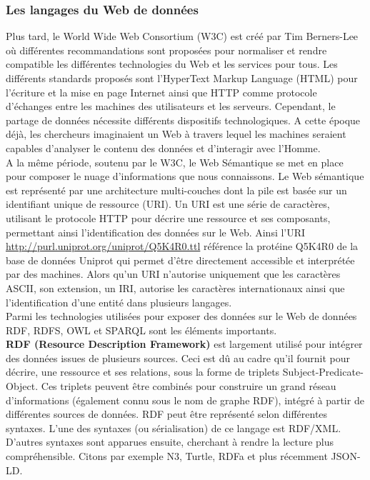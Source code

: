 \subsubsection*{Les langages du Web de données}

Plus tard, le World Wide Web Consortium (W3C) est créé par Tim Berners-Lee où différentes recommandations sont proposées pour normaliser et rendre compatible les différentes technologies du Web et les services pour tous. Les différents standards proposés sont l'HyperText Markup Language (HTML) pour l’écriture et la mise en page Internet ainsi que HTTP comme protocole d’échanges entre les machines des utilisateurs et les serveurs. Cependant, le partage de données nécessite différents dispositifs technologiques. A cette époque déjà, les chercheurs imaginaient un Web à travers lequel les machines seraient capables d’analyser le contenu des données et d'interagir avec l’Homme.\\

A la même période, soutenu par le W3C, le Web Sémantique se met en place pour composer le nuage d’informations que nous connaissons. Le Web sémantique est représenté par une architecture multi-couches dont la pile est basée sur un identifiant unique de ressource (URI). Un URI est une série de caractères, utilisant le protocole HTTP pour décrire une ressource et ses composants, permettant ainsi l’identification des données sur le Web. Ainsi l’URI \url{http://purl.uniprot.org/uniprot/Q5K4R0.ttl} référence la protéine Q5K4R0 de la base de données Uniprot qui permet d’être directement accessible et interprétée par des machines. Alors qu'un URI n'autorise uniquement que les caractères ASCII, son extension, un IRI, autorise les caractères internationaux ainsi que l'identification d'une entité dans plusieurs langages.\\


Parmi les technologies utilisées pour exposer des données sur le Web de données RDF, RDFS, OWL et SPARQL sont les éléments importants.\\

\textbf{RDF (Resource Description Framework)} est largement utilisé pour intégrer des données issues de plusieurs sources. Ceci est dû au cadre qu'il fournit pour décrire, une ressource et ses relations, sous la forme de triplets Subject-Predicate-Object. Ces triplets peuvent être combinés pour construire un grand réseau d'informations (également connu sous le nom de graphe RDF), intégré à partir de différentes sources de données.  RDF peut être représenté selon différentes syntaxes. L'une des syntaxes (ou sérialisation) de ce langage est RDF/XML. D'autres syntaxes sont apparues ensuite, cherchant à rendre la lecture plus compréhensible. Citons par exemple N3, Turtle, RDFa et plus récemment JSON-LD.\\ 

